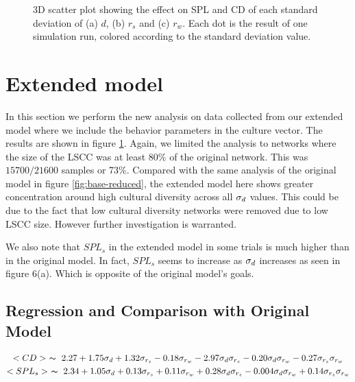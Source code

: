 

\begin{figure}[hbt!]\centering
    \par

	\hfill

    \caption{3D scatter plot showing the effect on SPL and CD of each
    standard deviation of (a) $d$, (b) $r_s$ and (c) $r_w$. Each dot is the result of one simulation run, colored
    according to the standard deviation value.}
    \label{fig:cAll}
\end{figure}
\section{Extended model}\label{sec:change}
In this section we perform the new analysis on data collected from our
extended model where we include the behavior parameters in the culture vector. The results are shown in figure \ref{fig:cAll}.
Again, we limited the analysis to networks where the size of the LSCC
was at least 80\% of the original network.
This was $15700/21600$ samples or 73\%.
Compared with the same analysis of the
original model in figure \ref{fig:base-reduced},
the extended model here shows greater concentration around high
cultural diversity across all $\sigma_d$ values.
This could be due to the fact that low cultural diversity networks
were removed due to low LSCC size.
However further investigation is warranted.

We also note that $SPL_s$ in the extended model in some trials is much higher than
in the original model. In fact, $SPL_s$ seems to increase as $\sigma_d$ increases as seen in figure 6(a). Which is opposite of the original model's goals.

\subsection{Regression and Comparison with Original Model}

\begin{gather}
    <CD> ~ \thicksim ~ 2.27 + 1.75\sigma_d + 1.32\sigma_{r_s} - 0.18\sigma_{r_w} -
                2.97\sigma_{d}\sigma_{r_s} - 0.20\sigma_{d}\sigma_{r_w} - 0.27\sigma_{r_s}\sigma_{r_w} \label{ca1}\\
    <SPL_s> ~ \thicksim ~ 2.34 + 1.05\sigma_d + 0.13\sigma_{r_s} + 0.11 \sigma_{r_w} +
                0.28\sigma_{d}\sigma_{r_s} - 0.004\sigma_{d}\sigma_{r_w} + 0.14\sigma_{r_s}\sigma_{r_w} \label{ca2}
\end{gather}

